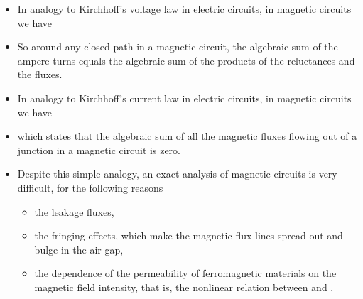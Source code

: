 \begin{ELjoin}

\begin{itemize}
\tightlist
\item
  In analogy to Kirchhoff's voltage law in electric circuits, in magnetic circuits we have
\end{itemize}

\begin{ELimportant}{}


\end{ELimportant}

\end{ELjoin}

\begin{ELjoin}

\begin{itemize}
\tightlist
\item
  So around any closed path in a magnetic circuit, the algebraic sum of the ampere-turns equals the algebraic sum of the products of the reluctances and the fluxes.
\item
  In analogy to Kirchhoff's current law in electric circuits, in magnetic circuits we have
\end{itemize}

\begin{ELimportant}{}


\end{ELimportant}

\end{ELjoin}

\begin{ELunit}

\begin{itemize}
\tightlist
\item
  which states that the algebraic sum of all the magnetic fluxes flowing out of a junction in a magnetic circuit is zero.
\item
  Despite this simple analogy, an exact analysis of magnetic circuits is very difficult, for the following reasons

  \begin{itemize}
  \tightlist
  \item
    the leakage fluxes,
  \item
    the fringing effects, which make the magnetic flux lines spread out and bulge in the air gap,
  \item
    the dependence of the permeability of ferromagnetic materials on the magnetic field intensity, that is, the nonlinear relation between  and .
  \end{itemize}
\end{itemize}

\end{ELunit}


